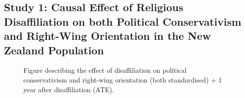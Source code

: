 \documentclass[
  singlecolumn]{article}
\begin{document}
\newpage{}

\subsection{Study 1: Causal Effect of Religious Disaffiliation on both
Political Conservativism and Right-Wing Orientation in the New Zealand
Population}\label{study-1-causal-effect-of-religious-disaffiliation-on-both-political-conservativism-and-right-wing-orientation-in-the-new-zealand-population}

\begin{figure}


\caption{\label{fig-ate}Figure describing the effect of disaffiliation
on political conservativism and right-wing orientation (both
standardised) + 1 year after disaffiliation (ATE).}

\end{figure}%
\end{document}
